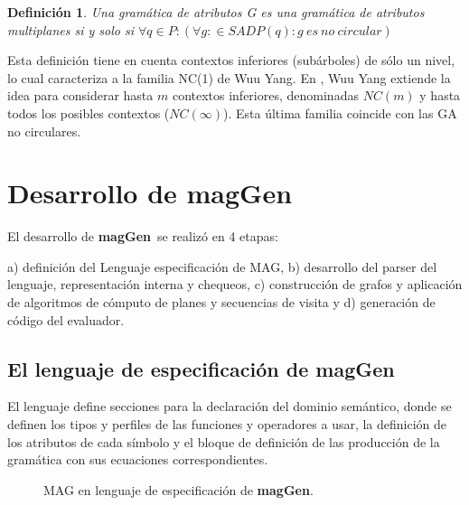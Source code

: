 \documentclass[a4paper]{article}
\newtheorem{definition}{Definición}[section]
\newcommand{\maggen}{\textbf{magGen}}
\begin{document}
\begin{definition}
Una gramática de atributos \textit{G} es una \textit{gramática de atributos multiplanes} si y solo si 
$
\forall q \in P: (\forall g: \in SADP(q) : g\ es\ no\ circular) 
$
\end{definition}

Esta definición tiene en cuenta contextos inferiores (subárboles) de sólo un nivel, lo cual
caracteriza a la familia NC(1) de Wuu Yang. En \cite{wuu-yang2}, Wuu Yang extiende la idea 
para considerar hasta $m$ contextos inferiores, denominadas $NC(m)$ y hasta todos los posibles
contextos ($NC(\infty)$). Esta última familia coincide con las GA no circulares.

\section{Desarrollo de \maggen}
\vspace{-0.2cm}
El desarrollo de \maggen\ se realizó en 4 etapas:

a) definición del Lenguaje especificación de MAG, b) desarrollo del parser del lenguaje,
representación interna y chequeos, c) construcción de grafos y aplicación de algoritmos de cómputo de planes y secuencias de visita y d) generación de código del evaluador.

\subsection{El lenguaje de especificación de \maggen}
\label{sec:lenguajeMAG}
 
El lenguaje define secciones para la declaración del dominio semántico, donde se definen los
tipos y perfiles de las funciones y operadores a usar, la definición de los atributos de cada
símbolo y el bloque de definición de las producción de la gramática con sus ecuaciones correspondientes.

\begin{figure}[!ht]
\vspace{-0.5cm}
\begin{minipage}{0.45\textwidth}
  \begin{center}

  \end{center}
\end{minipage}
\hspace{0.6cm}\begin{minipage}{0.45\textwidth}
  \begin{center}

  \end{center}
\end{minipage}
\vspace{-0,5cm}
\caption{\label{fig:MAG_traducida}MAG en lenguaje de especificación de \maggen.}
\end{figure}
\end{document}
